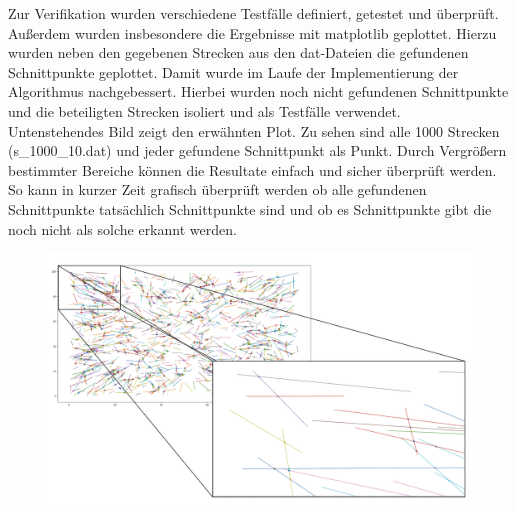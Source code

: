 \documentclass[12pt]{scrartcl}
\begin{document}
Zur Verifikation wurden verschiedene Testfälle definiert, getestet und überprüft.
Außerdem wurden insbesondere die Ergebnisse mit matplotlib geplottet.
Hierzu wurden neben den gegebenen Strecken aus den dat-Dateien die gefundenen Schnittpunkte geplottet.
Damit wurde im Laufe der Implementierung der Algorithmus nachgebessert.
Hierbei wurden noch nicht gefundenen Schnittpunkte und die beteiligten Strecken isoliert und als Testfälle verwendet.\\
Untenstehendes Bild zeigt den erwähnten Plot. Zu sehen sind alle 1000 Strecken (s\_1000\_10.dat) und jeder gefundene Schnittpunkt als Punkt.
Durch Vergrößern bestimmter Bereiche können die Resultate einfach und sicher überprüft werden. 
So kann in kurzer Zeit grafisch überprüft werden ob alle gefundenen Schnittpunkte tatsächlich Schnittpunkte sind und 
ob es Schnittpunkte gibt die noch nicht als solche erkannt werden.\\


\begin{figure}[ht]
    \centering
    \includegraphics[scale=0.25]{Plot_zoom_and_all.jpeg}
\end{figure}





\end{document}
